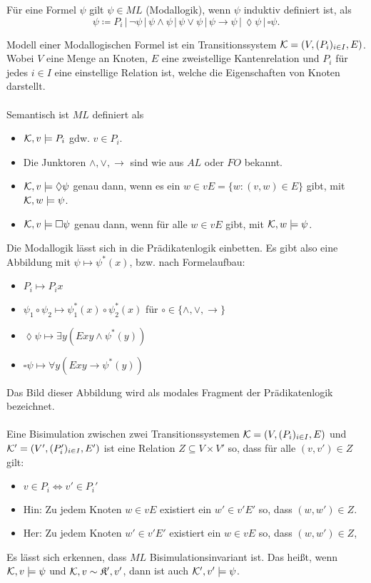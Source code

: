 Für eine Formel $\psi$ gilt $\psi\in ML$ (Modallogik), wenn $\psi$ induktiv definiert ist, als
\[\psi\coloneqq P_i \,\vert\, \neg\psi \,\vert\, \psi\land\psi \,\vert\, \psi\lor\psi \,\vert\, \psi\rightarrow\psi \,\vert\, \lozenge\psi \,\vert\, \square\psi.\]

Modell einer Modallogischen Formel ist ein Transitionssystem $\mathcal{K}=(V,(P_i)_{i\in I}, E)$. Wobei $V$ eine Menge an Knoten, $E$ eine zweistellige Kantenrelation und $P_i$ für jedes $i\in I$ eine einstellige Relation ist, welche die Eigenschaften von Knoten darstellt.
\\
\\
Semantisch ist $ML$ definiert als
\begin{itemize}
	\item $\mathcal{K},v\models P_i$ gdw. $v\in P_i$.
	\item Die Junktoren $\land,\lor,\rightarrow$ sind wie aus $AL$ oder $FO$ bekannt.
	\item $\mathcal{K},v\models \lozenge \psi$ genau dann, wenn es ein $w\in vE=\{w:(v,w)\in E\}$ gibt, mit $\mathcal{K},w\models \psi$.
	\item $\mathcal{K},v\models \square \psi$ genau dann, wenn für alle $w\in vE$ gibt, mit $\mathcal{K},w\models \psi$.
\end{itemize}
Die Modallogik lässt sich in die Prädikatenlogik einbetten. Es gibt also eine Abbildung mit $\psi\mapsto \psi^\ast(x)$, bzw. nach Formelaufbau:

\begin{itemize}
	\item $P_i\mapsto P_i x$
	\item $\psi_1\circ \psi_2\mapsto \psi_1^\ast(x)\circ\psi_2^\ast(x)$ für $\circ\in\{\land,\lor,\rightarrow\}$
	\item $\lozenge\psi\mapsto\exists y (Exy \land \psi^\ast(y))$
	\item $\square\psi \mapsto \forall y (Exy\rightarrow \psi^\ast(y))$
\end{itemize}
Das Bild dieser Abbildung wird als modales Fragment der Prädikatenlogik bezeichnet.
\\
\\
Eine Bisimulation zwischen zwei Transitionssystemen $\mathcal{K}=(V,(P_i)_{i\in I}, E)$ und $\mathcal{K}'=(V',(P_i')_{i\in I}, E')$ ist eine Relation $Z\subseteq V\times V'$ so, dass für alle $(v,v')\in Z$ gilt:
\begin{itemize}
	\item $v\in P_i\Leftrightarrow v'\in P_i'$
	\item Hin: Zu jedem Knoten $w\in vE$ existiert ein $w'\in v'E'$ so, dass $(w,w')\in Z$.
	\item Her: Zu jedem Knoten $w'\in v'E'$ existiert ein $w\in vE$ so, dass $(w,w')\in Z$,
\end{itemize}
Es lässt sich erkennen, dass $ML$ Bisimulationsinvariant ist. Das heißt, wenn $\mathcal{K},v\models \psi$ und $\mathcal{K},v\sim \mathfrak{K'},v'$, dann ist auch $\mathcal{K}',v'\models \psi$.


